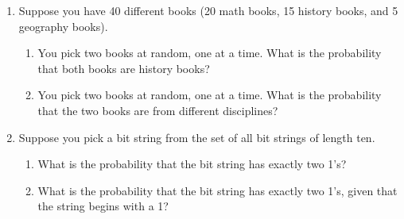 \documentclass[12pt]{article}
\begin{document}
\begin{enumerate}[leftmargin=\labelsep]
\item Suppose you have 40 different books (20 math books, 15 history books, and 5
geography books).
    \begin{enumerate}
        \item You pick two books at random, one at a time. What is the probability that both books are history books?
        \item You pick two books at random, one at a time. What is the probability that the two books are from different disciplines?
    \end{enumerate}

\item Suppose you pick a bit string from the set of all bit strings of length ten.
    \begin{enumerate}
        \item What is the probability that the bit string has exactly two 1’s?
        \item What is the probability that the bit string has exactly two 1’s, given that the string begins with a 1?
    \end{enumerate}
\end{enumerate}
\end{document}
